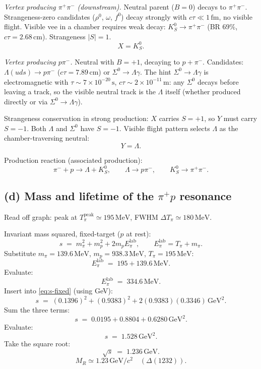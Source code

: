 \documentclass[11pt]{article}
\begin{document}
\emph{Vertex producing $\pi^{+}\pi^{-}$ (downstream).} Neutral parent ($B=0$) decays to $\pi^{+}\pi^{-}$. Strangeness-zero candidates ($\rho^{0}$, $\omega$, $f^{0}$) decay strongly with $c\tau\ll 1\,\text{fm}$, no visible flight. Visible vee in a chamber requires weak decay: $K^{0}_{S}\to\pi^{+}\pi^{-}$ (BR $69\%$, $c\tau=2.68\,\text{cm}$). Strangeness $|S|=1$.
\[
\boxed{\;X=K^{0}_{S}.\;}
\]

\emph{Vertex producing $p\pi^{-}$.} Neutral with $B=+1$, decaying to $p+\pi^{-}$. Candidates: $\Lambda(uds)\to p\pi^{-}$ ($c\tau=7.89\,\text{cm}$) or $\Sigma^{0}\to\Lambda\gamma$. The hint $\Sigma^{0}\to\Lambda\gamma$ is electromagnetic with $\tau\sim 7\times 10^{-20}\,\text{s}$, $c\tau\sim 2\times 10^{-11}\,\text{m}$: any $\Sigma^{0}$ decays before leaving a track, so the visible neutral track is the $\Lambda$ itself (whether produced directly or via $\Sigma^{0}\to\Lambda\gamma$).

Strangeness conservation in strong production: $X$ carries $S=+1$, so $Y$ must carry $S=-1$. Both $\Lambda$ and $\Sigma^{0}$ have $S=-1$. Visible flight pattern selects $\Lambda$ as the chamber-traversing neutral:
\[
\boxed{\;Y=\Lambda.\;}
\]

Production reaction (associated production):
\[
\pi^{-}+p\to\Lambda+K^{0}_{S},\qquad\Lambda\to p\pi^{-},\qquad K^{0}_{S}\to\pi^{+}\pi^{-}.
\]

\subsection*{(d) Mass and lifetime of the $\pi^{+}p$ resonance}

Read off graph: peak at $T_{\pi}^{\text{peak}}\simeq 195\,\text{MeV}$, FWHM $\Delta T_{\pi}\simeq 180\,\text{MeV}$.

Invariant mass squared, fixed-target ($p$ at rest):
\begin{equation}
s\;=\;m_{\pi}^{2}+m_{p}^{2}+2m_{p}E_{\pi}^{\text{lab}},\qquad E_{\pi}^{\text{lab}}=T_{\pi}+m_{\pi}.
\label{eq:s-fixed}
\end{equation}
Substitute $m_{\pi}=139.6\,\text{MeV}$, $m_{p}=938.3\,\text{MeV}$, $T_{\pi}=195\,\text{MeV}$:
\[
E_{\pi}^{\text{lab}}\;=\;195+139.6\,\text{MeV}.
\]
Evaluate:
\[
E_{\pi}^{\text{lab}}\;=\;334.6\,\text{MeV}.
\]
Insert into \eqref{eq:s-fixed} (using GeV):
\[
s\;=\;(0.1396)^{2}+(0.9383)^{2}+2(0.9383)(0.3346)\,\text{GeV}^{2}.
\]
Sum the three terms:
\[
s\;=\;0.0195+0.8804+0.6280\,\text{GeV}^{2}.
\]
Evaluate:
\[
s\;=\;1.528\,\text{GeV}^{2}.
\]
Take the square root:
\[
\sqrt{s}\;=\;1.236\,\text{GeV}.
\]
\begin{equation}
\boxed{\;M_{R}\simeq 1.23\,\text{GeV}/c^{2}\quad(\Delta(1232)).\;}
\end{equation}
\end{document}
